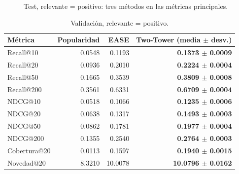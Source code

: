 \begin{figure}[H]\centering{}
\caption{Test, relevante = positivo: tres métodos en las métricas principales.}\label{fig:barras}\end{figure}

\begin{table}[H]\centering\small
\begin{tabular}{lrrr}\toprule
Métrica & Popularidad & EASE & Two-Tower (media $\pm$ desv.) \\\midrule
Recall@10 & 0.0548 & 0.1193 & \textbf{0.1373 $\pm$ 0.0009} \\
Recall@20 & 0.0936 & 0.2010 & \textbf{0.2224 $\pm$ 0.0004} \\
Recall@50 & 0.1665 & 0.3539 & \textbf{0.3809 $\pm$ 0.0008} \\
Recall@200 & 0.3561 & 0.6331 & \textbf{0.6709 $\pm$ 0.0004} \\
NDCG@10 & 0.0518 & 0.1066 & \textbf{0.1235 $\pm$ 0.0006} \\
NDCG@20 & 0.0638 & 0.1317 & \textbf{0.1493 $\pm$ 0.0003} \\
NDCG@50 & 0.0862 & 0.1781 & \textbf{0.1977 $\pm$ 0.0004} \\
NDCG@200 & 0.1355 & 0.2540 & \textbf{0.2764 $\pm$ 0.0003} \\
Cobertura@20 & 0.0113 & 0.1597 & \textbf{0.1940 $\pm$ 0.0015} \\
Novedad@20 & 8.3210 & 10.0078 & \textbf{10.0796 $\pm$ 0.0162} \\
\bottomrule\end{tabular}
\caption{Validación, relevante = positivo.}\label{tab:val_pos}
\end{table}

